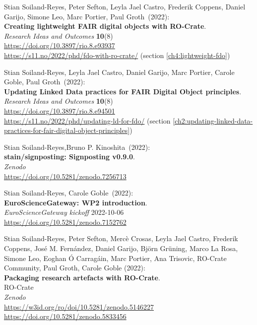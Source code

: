 \begin{thebibliography}{9}
Stian Soiland-Reyes, Peter Sefton, Leyla Jael Castro, Frederik Coppens, Daniel Garijo, Simone Leo, Marc Portier, Paul Groth~(2022): \\
\textbf{Creating lightweight FAIR digital objects with RO-Crate}.\\
\emph{Research Ideas and Outcomes} \textbf{10}(8) \\
\url{https://doi.org/10.3897/rio.8.e93937} \\
\url{https://s11.no/2022/phd/fdo-with-ro-crate/}
(section \vref{ch4:lightweight-fdo})

Stian Soiland-Reyes, Leyla Jael Castro, Daniel Garijo, Marc Portier, Carole Goble, Paul Groth~(2022): \\
\textbf{Updating Linked Data practices for FAIR Digital Object principles}. \\
\emph{Research Ideas and Outcomes} \textbf{10}(8)\\
\url{https://doi.org/10.3897/rio.8.e94501}\\
\url{https://s11.no/2022/phd/updating-ld-for-fdo/} (section \vref{ch2:updating-linked-data-practices-for-fair-digital-object-principles})

Stian Soiland-Reyes,Bruno P. Kinoshita~(2022): \\
\textbf{stain/signposting: Signposting v0.9.0}.\\
\emph{Zenodo}\\
\url{https://doi.org/10.5281/zenodo.7256713}

Stian Soiland-Reyes, Carole Goble~(2022): \\
\textbf{EuroScienceGateway: WP2 introduction}.\\
\emph{EuroScienceGateway kickoff} 2022-10-06\\
\url{https://doi.org/10.5281/zenodo.7152762}

Stian Soiland-Reyes, Peter Sefton, Mercè Crosas, Leyla Jael Castro, Frederik Coppens, José M. Fernández, Daniel Garijo, Björn Grüning, Marco La Rosa, Simone Leo, Eoghan Ó Carragáin, Marc Portier, Ana Trisovic, RO-Crate Community, Paul Groth, Carole Goble (2022): \\
\textbf{Packaging research artefacts with RO-Crate}. \\
RO-Crate\\
\emph{Zenodo}\\
\url{https://w3id.org/ro/doi/10.5281/zenodo.5146227} \\
\url{https://doi.org/10.5281/zenodo.5833456}



\end{thebibliography}
